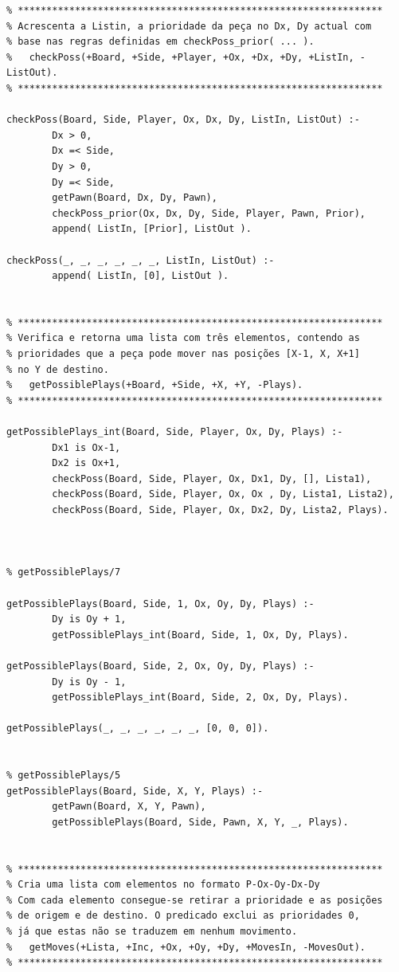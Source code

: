 \documentclass[15pt,a4paper]{article}
\begin{document}
\begin{lstlisting}
% ****************************************************************
% Acrescenta a Listin, a prioridade da peça no Dx, Dy actual com
% base nas regras definidas em checkPoss_prior( ... ).
%	checkPoss(+Board, +Side, +Player, +Ox, +Dx, +Dy, +ListIn, -ListOut).
% ****************************************************************      

checkPoss(Board, Side, Player, Ox, Dx, Dy, ListIn, ListOut) :-
		Dx > 0,
		Dx =< Side,
		Dy > 0,
		Dy =< Side,
		getPawn(Board, Dx, Dy, Pawn),
		checkPoss_prior(Ox, Dx, Dy, Side, Player, Pawn, Prior),
		append( ListIn, [Prior], ListOut ).
		
checkPoss(_, _, _, _, _, _, ListIn, ListOut) :-
		append( ListIn, [0], ListOut ).
		

% ****************************************************************
% Verifica e retorna uma lista com três elementos, contendo as
% prioridades que a peça pode mover nas posições [X-1, X, X+1]
% no Y de destino.
%	getPossiblePlays(+Board, +Side, +X, +Y, -Plays).
% ****************************************************************   
		
getPossiblePlays_int(Board, Side, Player, Ox, Dy, Plays) :-
		Dx1 is Ox-1,
		Dx2 is Ox+1,
		checkPoss(Board, Side, Player, Ox, Dx1, Dy, [], Lista1),
		checkPoss(Board, Side, Player, Ox, Ox , Dy, Lista1, Lista2),
		checkPoss(Board, Side, Player, Ox, Dx2, Dy, Lista2, Plays).

		
		
% getPossiblePlays/7		

getPossiblePlays(Board, Side, 1, Ox, Oy, Dy, Plays) :-
		Dy is Oy + 1,
		getPossiblePlays_int(Board, Side, 1, Ox, Dy, Plays).
		
getPossiblePlays(Board, Side, 2, Ox, Oy, Dy, Plays) :-
		Dy is Oy - 1,
		getPossiblePlays_int(Board, Side, 2, Ox, Dy, Plays).
		
getPossiblePlays(_, _, _, _, _, _, [0, 0, 0]).
		

% getPossiblePlays/5
getPossiblePlays(Board, Side, X, Y, Plays) :-
		getPawn(Board, X, Y, Pawn),
		getPossiblePlays(Board, Side, Pawn, X, Y, _, Plays).
		

% ****************************************************************
% Cria uma lista com elementos no formato P-Ox-Oy-Dx-Dy
% Com cada elemento consegue-se retirar a prioridade e as posições
% de origem e de destino. O predicado exclui as prioridades 0,
% já que estas não se traduzem em nenhum movimento.
%	getMoves(+Lista, +Inc, +Ox, +Oy, +Dy, +MovesIn, -MovesOut).
% ****************************************************************


\end{lstlisting}
\end{document}
